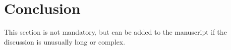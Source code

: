 
\section{Conclusion}

This section is not mandatory, but can be added to the manuscript if the discussion is unusually long or complex.


